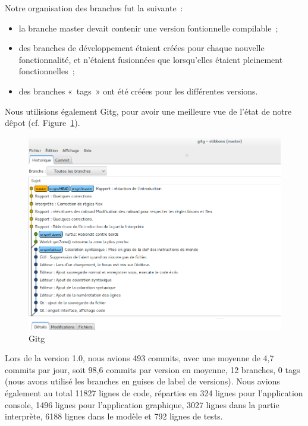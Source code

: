 Notre organisation des branches fut la suivante~:
\begin{itemize}
\item la branche master devait contenir une version fontionnelle compilable~;
\item des branches de développement étaient créées pour chaque nouvelle fonctionnalité, et n'étaient fusionnées que lorsqu'elles étaient pleinement fonctionnelles~;
\item des branches «~tags~» ont été créées pour les différentes versions.
\end{itemize}
Nous utilisions également Gitg, pour avoir une meilleure vue de l'état de notre dêpot (cf. Figure~\ref{Gitg}).
\begin{figure}[h]
\centering
\includegraphics[scale=0.35]{doc/gestionProjet/gitbranche.png}
\caption{\label{Gitg} Gitg}
\end{figure}
Lors de la version 1.0, nous avions 493 commits, avec une moyenne de 4,7 commits par jour, soit 98,6 commits par version en moyenne, 12 branches, 0 tags (nous avons utilisé les branches en guises de label de versions).
Nous avions également au total 11827 lignes de code, réparties en 324 lignes pour l'application console, 1496 lignes pour l'application graphique, 3027 lignes dans la partie interprète, 6188 lignes dans le modèle et 792 lignes de tests.
